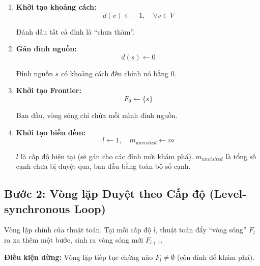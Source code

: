 \documentclass[12pt,a4paper]{article}
\begin{document}
\begin{enumerate}
  \item \textbf{Khởi tạo khoảng cách:}
  \begin{equation}
  d(v) \leftarrow -1, \quad \forall v \in V
  \end{equation}
  \begin{explain}
  Đánh dấu tất cả đỉnh là ``chưa thăm''.
  \end{explain}

  \item \textbf{Gán đỉnh nguồn:}
  \begin{equation}
  d(s) \leftarrow 0
  \end{equation}
  \begin{explain}
  Đỉnh nguồn $s$ có khoảng cách đến chính nó bằng 0.
  \end{explain}

  \item \textbf{Khởi tạo Frontier:}
  \begin{equation}
  F_0 \leftarrow \{s\}
  \end{equation}
  \begin{explain}
  Ban đầu, vòng sóng chỉ chứa mỗi mình đỉnh nguồn.
  \end{explain}

  \item \textbf{Khởi tạo biến đếm:}
  \begin{equation}
  l \leftarrow 1, \quad m_{unvisited} \leftarrow m
  \end{equation}
  \begin{explain}
  $l$ là cấp độ hiện tại (sẽ gán cho các đỉnh mới khám phá). $m_{unvisited}$ là tổng số cạnh chưa bị duyệt qua, ban đầu bằng toàn bộ số cạnh.
  \end{explain}
\end{enumerate}

\subsection{Bước 2: Vòng lặp Duyệt theo Cấp độ (Level-synchronous Loop)}

Vòng lặp chính của thuật toán. Tại mỗi cấp độ $l$, thuật toán đẩy ``vòng sóng'' $F_l$ ra xa thêm một bước, sinh ra vòng sóng mới $F_{l+1}$.

\textbf{Điều kiện dừng:} Vòng lặp tiếp tục chừng nào $F_l \neq \emptyset$ (còn đỉnh để khám phá).
\end{document}
